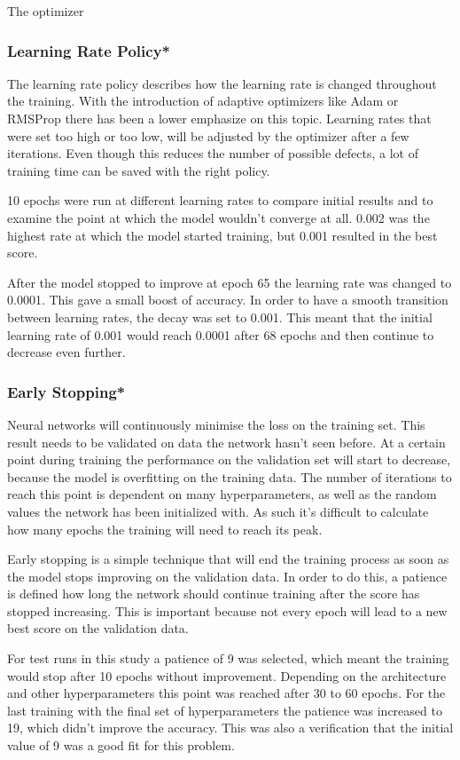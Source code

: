 The optimizer 

\subsubsection{Learning Rate Policy*}

The learning rate policy describes how the learning rate is changed throughout the training. With the introduction of adaptive optimizers like Adam or RMSProp there has been a lower emphasize on this topic. Learning rates that were set too high or too low, will be adjusted by the optimizer after a few iterations. Even though this reduces the number of possible defects, a lot of training time can be saved with the right policy.

10 epochs were run at different learning rates to compare initial results and to examine the point at which the model wouldn't converge at all. 0.002 was the highest rate at which the model started training, but 0.001 resulted in the best score.

After the model stopped to improve at epoch 65 the learning rate was changed to 0.0001. This gave a small boost of accuracy. In order to have a smooth transition between learning rates, the decay was set to 0.001. This meant that the initial learning rate of 0.001 would reach 0.0001 after 68 epochs and then continue to decrease even further.

\subsubsection{Early Stopping*}

Neural networks will continuously minimise the loss on the training set. This result needs to be validated on data the network hasn't seen before. At a certain point during training the performance on the validation set will start to decrease, because the model is overfitting on the training data. The number of iterations to reach this point is dependent on many hyperparameters, as well as the random values the network has been initialized with. As such it's difficult to calculate how many epochs the training will need to reach its peak.

Early stopping is a simple technique that will end the training process as soon as the model stops improving on the validation data. In order to do this, a patience is defined how long the network should continue training after the score has stopped increasing. This is important because not every epoch will lead to a new best score on the validation data.

For test runs in this study a patience of 9 was selected, which meant the training would stop after 10 epochs without improvement. Depending on the architecture and other hyperparameters this point was reached after 30 to 60 epochs. For the last training with the final set of hyperparameters the patience was increased to 19, which didn't improve the accuracy.  This was also a verification that the initial value of 9 was a good fit for this problem.



\newpage
